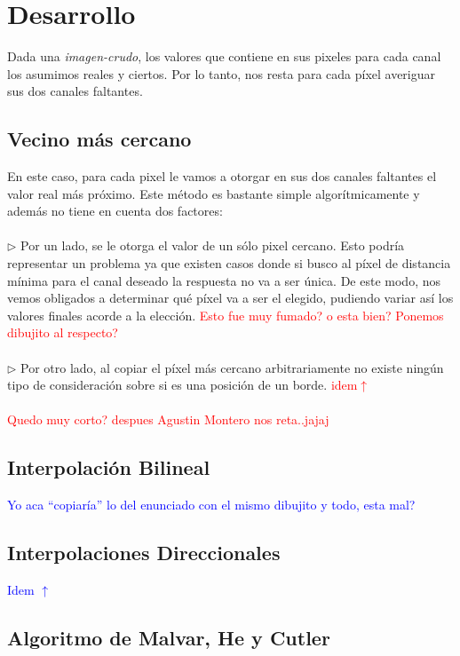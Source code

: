 \documentclass[a4paper]{article}
\begin{document}
\newpage
\section{Desarrollo}

Dada una \textit{imagen-crudo}, los valores que contiene en sus pixeles para cada canal los asumimos reales y ciertos. Por lo tanto, nos resta para cada p\'ixel averiguar sus dos canales faltantes. 

\subsection{Vecino m\'as cercano}
En este caso, para cada pixel le vamos a otorgar en sus dos canales faltantes el valor real m\'as pr\'oximo. Este m\'etodo es bastante simple algor\'itmicamente y adem\'as no tiene en cuenta dos factores: \\
\\
$\triangleright$ Por un lado, se le otorga el valor de un s\'olo pixel cercano. Esto podr\'ia representar un problema ya que existen casos donde si busco al p\'ixel de distancia m\'inima para el canal deseado la respuesta no va a ser \'unica. De este modo, nos vemos obligados a determinar qu\'e p\'ixel va a ser el elegido, pudiendo variar as\'i los valores finales acorde a la elecci\'on. \textcolor{red}{Esto fue muy fumado? o esta bien? Ponemos dibujito al respecto?} \\ 
\\
$\triangleright$ Por otro lado, al copiar el p\'ixel m\'as cercano arbitrariamente no existe ning\'un tipo de consideraci\'on sobre si es una posici\'on de un borde. \textcolor{red}{idem$\uparrow$}\\
\\
\textcolor{red}{Quedo muy corto? despues Agustin Montero nos reta..jajaj}\\

\subsection{Interpolaci\'on Bilineal}
\textcolor{blue}{Yo aca “copiar\'ia” lo del enunciado con el mismo dibujito y todo, esta mal?}
\subsection{Interpolaciones Direccionales}
\textcolor{blue}{Idem $\uparrow$}
\subsection{Algoritmo de Malvar, He y Cutler}
\end{document}
